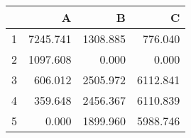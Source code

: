 \begin{tabular}{rrrr}
\toprule
     &        A &        B &        C \\
\midrule
   1 & \num{7245.741} & \num{1308.885} &  \num{776.040} \\
   2 & \num{1097.608} &    \num{0.000} &    \num{0.000} \\
   3 &  \num{606.012} & \num{2505.972} & \num{6112.841} \\
   4 &  \num{359.648} & \num{2456.367} & \num{6110.839} \\
   5 &    \num{0.000} & \num{1899.960} & \num{5988.746} \\
\bottomrule
\end{tabular}